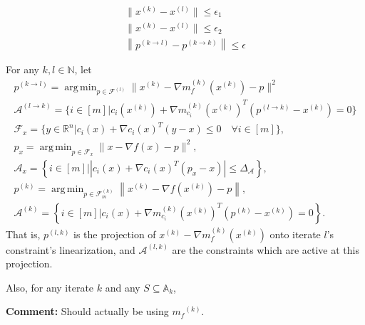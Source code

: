 \documentclass{article}
\newenvironment{comment}
  {\par\medskip
   \color{red}%
   \begin{framed}
   \textbf{Comment: }\ignorespaces}
 {\end{framed}
  \medskip}
\theoremstyle{case}
\numberwithin{theorem}{subsection}
\DeclareMathOperator*{\argmin}{arg\,min}
\newcommand{\activeconstraintsk}{{\mathbb A_{k}}}
\newcommand{\feasiblek}{{\mathcal F_m^{(k)}}}
\newcommand{\gk}{{\nabla m_f^{(k)}\left(\xk\right)}}
\newcommand{\gmcik}{{\nabla m_{c_i}^{(k)}\left(\xk\right)}}
\newcommand{\gradf}{\nabla f}
\newcommand{\mfk}{{{m}_f}^{(k)}}
\newcommand{\minactivegraddelta}{{\Delta_{\mathcal A}}}
\newcommand{\naturals}{\mathbb N}
\newcommand{\Rn}{\mathbb R^n}
\newcommand{\xk}{x^{(k)}}
\begin{document}
\begin{align*}
\|\xk - x^{(l)}\| \le \epsilon_1 \\
\|\xk - x^{(l)}\| \le \epsilon_2 \\
\left\|p^{(k\to l)} - p^{(k\to k)}\right\| \le \epsilon
\end{align*}


For any $k, l \in \naturals$, let 
\begin{align}
p^{(k \to l)} = \argmin_{p \in \mathcal F^{(l)}} \|\xk - \gk - p\|^2 \label{bp2_define_plk} \\
\mathcal A^{(l \to k)} = \{i \in [m] | c_i(\xk) + \gmcik^T(p^{(l\to k)} - \xk) = 0 \} \label{bp_define_activep_not_used} \\
\mathcal F_x = \{ y \in \Rn | c_i(x) + \nabla c_i(x)^T(y - x) \le 0 \quad \forall i \in [m]\}, \label{bp_define_true_linearization_not_used} \\
p_x = \argmin_{p \in \mathcal F_x} \|x - \gradf(x) - p\|^2, \label{bp_define_true_projection_not_used} \\
\mathcal A_x = \left\{i \in [m] | \left|c_i(x) + \nabla c_i(x)^T(p_x - x)\right| \le \minactivegraddelta \right\}, \label{define_projection_active_not_used} \\
p^{(k)} = \argmin_{p \in \feasiblek} \left\| \xk - \nabla f\left(\xk\right) - p \right\|, \label{bp_define_pl_not_used} \\
\mathcal A^{(k)} = \left\{i \in [m] | c_i(x) + \gmcik^T\left(p^{(k)} - \xk\right) = 0 \right\}. \label{bp_define_yet_another_thing_not_used}
\end{align}
That is, $p^{(l, k)}$ is the projection of $\xk - \gk$ onto iterate $l$'s constraint's linearization,
and $\mathcal A^{(l, k)}$ are the constraints which are active at this projection.

Also, for any iterate $k$ and any $S \subseteq \activeconstraintsk$,






\appendix


\begin{comment}
Should actually be using $\mfk$.
\end{comment}
\end{document}
